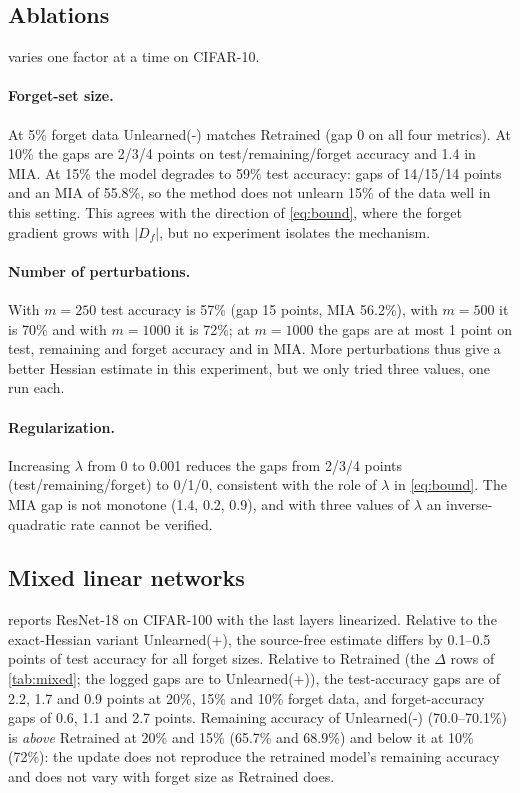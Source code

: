 \documentclass[10pt,twocolumn,letterpaper]{article}
\begin{document}


\subsection{Ablations}
\label{sec:abl}
 varies one factor at a time on CIFAR-10.

\paragraph{Forget-set size.}
At 5\% forget data Unlearned(-) matches Retrained (gap 0 on all four metrics).
At 10\% the gaps are 2/3/4 points on test/remaining/forget accuracy and 1.4 in MIA.
At 15\% the model degrades to 59\% test accuracy: gaps of 14/15/14 points and an MIA of 55.8\%, so the method does not unlearn 15\% of the data well in this setting.
This agrees with the direction of \cref{eq:bound}, where the forget gradient grows with $|D_f|$, but no experiment isolates the mechanism.

\paragraph{Number of perturbations.}
With $m=250$ test accuracy is 57\% (gap 15 points, MIA 56.2\%), with $m=500$ it is 70\% and with $m=1000$ it is 72\%; at $m=1000$ the gaps are at most 1 point on test, remaining and forget accuracy and in MIA.
More perturbations thus give a better Hessian estimate in this experiment, but we only tried three values, one run each.

\paragraph{Regularization.}
Increasing $\lambda$ from 0 to 0.001 reduces the gaps from 2/3/4 points (test/remaining/forget) to 0/1/0, consistent with the role of $\lambda$ in \cref{eq:bound}.
The MIA gap is not monotone (1.4, 0.2, 0.9), and with three values of $\lambda$ an inverse-quadratic rate cannot be verified.

\subsection{Mixed linear networks}
\label{sec:mixed}
 reports ResNet-18 on CIFAR-100 with the last layers linearized.
Relative to the exact-Hessian variant Unlearned(+), the source-free estimate differs by 0.1--0.5 points of test accuracy for all forget sizes.
Relative to Retrained (the $\Delta$ rows of \cref{tab:mixed}; the logged gaps are to Unlearned(+)), the test-accuracy gaps are of 2.2, 1.7 and 0.9 points at 20\%, 15\% and 10\% forget data, and forget-accuracy gaps of 0.6, 1.1 and 2.7 points.
Remaining accuracy of Unlearned(-) (70.0--70.1\%) is \emph{above} Retrained at 20\% and 15\% (65.7\% and 68.9\%) and below it at 10\% (72\%): the update does not reproduce the retrained model's remaining accuracy and does not vary with forget size as Retrained does.
\end{document}
